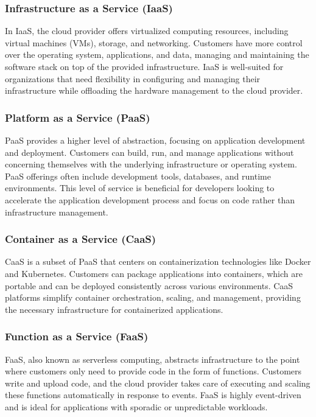 \subsubsection{Infrastructure as a Service (IaaS)}
In IaaS, the cloud provider offers virtualized computing resources, including virtual machines (VMs), storage, and networking.
Customers have more control over the operating system, applications, and data, managing and maintaining the software stack on top of the provided infrastructure.
IaaS is well-suited for organizations that need flexibility in configuring and managing their infrastructure while offloading the hardware management to the cloud provider.

\subsubsection{Platform as a Service (PaaS)}
PaaS provides a higher level of abstraction, focusing on application development and deployment.
Customers can build, run, and manage applications without concerning themselves with the underlying infrastructure or operating system.
PaaS offerings often include development tools, databases, and runtime environments.
This level of service is beneficial for developers looking to accelerate the application development process and focus on code rather than infrastructure management.

\subsubsection{Container as a Service (CaaS)}
CaaS is a subset of PaaS that centers on containerization technologies like Docker and Kubernetes.
Customers can package applications into containers, which are portable and can be deployed consistently across various environments.
CaaS platforms simplify container orchestration, scaling, and management, providing the necessary infrastructure for containerized applications.

\subsubsection{Function as a Service (FaaS)}
FaaS, also known as serverless computing, abstracts infrastructure to the point where customers only need to provide code in the form of functions.
Customers write and upload code, and the cloud provider takes care of executing and scaling these functions automatically in response to events.
FaaS is highly event-driven and is ideal for applications with sporadic or unpredictable workloads.

